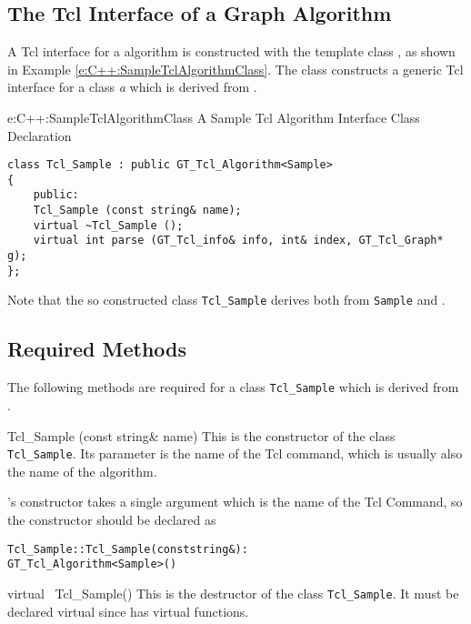 \documentclass[twoside,fleqn]{report}
\begin{document}
%
%

\subsection{The Tcl Interface of a Graph Algorithm} 
\label{s:GT_Tcl_Interface}

A Tcl interface for a \Graphlet{} algorithm is constructed with
the template class , as shown in Example
\ref{e:C++:SampleTclAlgorithmClass}. The class
 constructs a generic Tcl
interface for a class \emph{a} which is derived from
.

\begin{example}%
{e:C++:SampleTclAlgorithmClass}%
{A Sample Tcl Algorithm Interface Class Declaration}
\begin{verbatim}
class Tcl_Sample : public GT_Tcl_Algorithm<Sample>
{
    public:    
    Tcl_Sample (const string& name);
    virtual ~Tcl_Sample ();
    virtual int parse (GT_Tcl_info& info, int& index, GT_Tcl_Graph* g);
};
\end{verbatim}
\end{example}

Note that the so constructed class \texttt{Tcl\_Sample} derives
both from \texttt{Sample} and .


\subsection{Required Methods}

The following methods are required for a class \texttt{Tcl\_Sample}
which is derived from .

\begin{Cdefinition}
  
  \item[Tcl\_Sample (const string\& name)] This is the
  constructor of the class \texttt{Tcl\_Sample}.  Its parameter
  is the name of the Tcl command, which is usually also the name
  of the algorithm.
  
  's constructor takes a single argument
  which is the name of the Tcl Command, so the constructor should
  be declared as

\begin{alltt}
Tcl_Sample::Tcl_Sample (const string& ) :
    GT_Tcl_Algorithm<Sample> ()
\end{alltt}

  \item[virtual ~Tcl\_Sample()] This is the destructor of the
  class \texttt{Tcl\_Sample}. It must be declared virtual since
   has virtual functions.
  
\end{Cdefinition}
\end{document}
